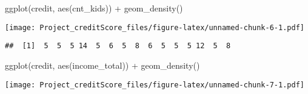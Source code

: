 \documentclass[
]{article}
\newenvironment{Shaded}{\begin{snugshade}}{\end{snugshade}}
\newcommand{\AttributeTok}[1]{\textcolor[rgb]{0.77,0.63,0.00}{#1}}
\newcommand{\DecValTok}[1]{\textcolor[rgb]{0.00,0.00,0.81}{#1}}
\newcommand{\FunctionTok}[1]{\textcolor[rgb]{0.00,0.00,0.00}{#1}}
\newcommand{\NormalTok}[1]{#1}
\newcommand{\OtherTok}[1]{\textcolor[rgb]{0.56,0.35,0.01}{#1}}
\newcommand{\SpecialCharTok}[1]{\textcolor[rgb]{0.00,0.00,0.00}{#1}}
\begin{document}
\begin{Shaded}
\begin{Highlighting}[]
\FunctionTok{ggplot}\NormalTok{(credit, }\FunctionTok{aes}\NormalTok{(cnt\_kids)) }\SpecialCharTok{+}
  \FunctionTok{geom\_density}\NormalTok{()}
\end{Highlighting}
\end{Shaded}

\texttt{[image: Project\_creditScore\_files/figure-latex/unnamed-chunk-6-1.pdf]}

\begin{Shaded}
\end{Shaded}

\begin{verbatim}
##  [1]  5  5  5 14  5  6  5  8  6  5  5  5 12  5  8
\end{verbatim}

\begin{Shaded}
\end{Shaded}

\begin{Shaded}
\begin{Highlighting}[]
\FunctionTok{ggplot}\NormalTok{(credit, }\FunctionTok{aes}\NormalTok{(income\_total)) }\SpecialCharTok{+}
  \FunctionTok{geom\_density}\NormalTok{()}
\end{Highlighting}
\end{Shaded}

\texttt{[image: Project\_creditScore\_files/figure-latex/unnamed-chunk-7-1.pdf]}

\begin{Shaded}
\end{Shaded}
\end{document}
